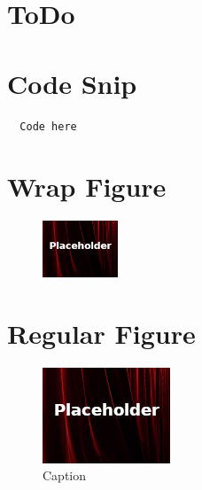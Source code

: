 \vspace{.15in}


\section{ToDo}

\section{Code Snip}
\begin{lstlisting}
  Code here
\end{lstlisting}

\section{Wrap Figure}
\begin{figure}
	\caption{} %
	\label{03:fig01} 
	\centering
	\includegraphics[width=0.2\textwidth]{gfx/99-placeholder} 
\end{figure}

\section{Regular Figure}
\begin{figure}[H]
	\centering
	\includegraphics[width=\maxwidth{.95\linewidth}]{gfx/99-placeholder}
	\caption{Caption}
	\label{03:fig01}
\end{figure}

